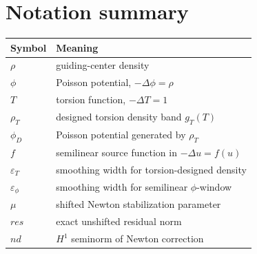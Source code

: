 \documentclass[11pt,a4paper]{article}
\newcommand{\eps}{\varepsilon}
\begin{document}
\section{Notation summary}
\begin{center}
\begin{tabular}{>{\ttfamily}p{}p{}}
\toprule
Symbol & Meaning\\
\midrule
$\rho$ & guiding-center density\\
$\phi$ & Poisson potential, $-\Delta\phi=\rho$\\
$T$ & torsion function, $-\Delta T=1$\\
$\rho_T$ & designed torsion density band $g_T(T)$\\
$\phi_D$ & Poisson potential generated by $\rho_T$\\
$f$ & semilinear source function in $-\Delta u=f(u)$\\
$\eps_T$ & smoothing width for torsion-designed density\\
$\eps_\phi$ & smoothing width for semilinear $\phi$-window\\
$\mu$ & shifted Newton stabilization parameter\\
$res$ & exact unshifted residual norm\\
$nd$ & $H^1$ seminorm of Newton correction\\
\bottomrule
\end{tabular}
\end{center}
\end{document}
